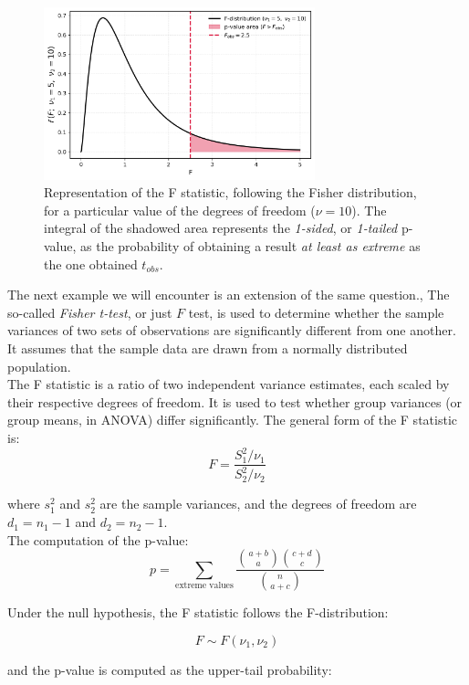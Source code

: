 \documentclass{book}
\begin{document}
\begin{figure}[ht]
    \centering
    \includegraphics[width=0.7\textwidth]{figures/chapter4/f_test_one_tailed.png}
    \caption{Representation of the F statistic, following the Fisher distribution, for a particular value of the degrees of freedom ($\nu = 10$). The integral of the shadowed area represents the \textit{1-sided}, or \textit{1-tailed} p-value, as the probability of obtaining a result \textit{at least as extreme} as the one obtained $t_{obs}$.}
    \label{fig:f_test1}
\end{figure}

The next example we will encounter is an extension of the same question., The so-called \textit{Fisher t-test}, or just $F$ test, is used to determine whether the sample variances of two sets of observations are significantly different from one another. It assumes that the sample data are drawn from a normally distributed population.\\

The F statistic is a ratio of two independent variance estimates, each scaled by their respective degrees of freedom. It is used to test whether group variances (or group means, in ANOVA) differ significantly. The general form of the F statistic is:
\[
F = \frac{S_1^2 / \nu_1}{S_2^2 / \nu_2}
\]

where $s_1^{2}$ and $s_2^{2}$ are the sample variances, and the degrees of freedom are $d_1 = n_1 - 1$ and $d_2 = n_2 - 1$.\\

The computation of the p-value:
\[
p = \sum_{\text{extreme values}} \frac{\binom{a+b}{a} \binom{c+d}{c}}{\binom{n}{a+c}}
\]

Under the null hypothesis, the F statistic follows the F-distribution:

\[
F \sim F(\nu_1, \nu_2)
\]

and the p-value is computed as the upper-tail probability:
\end{document}

